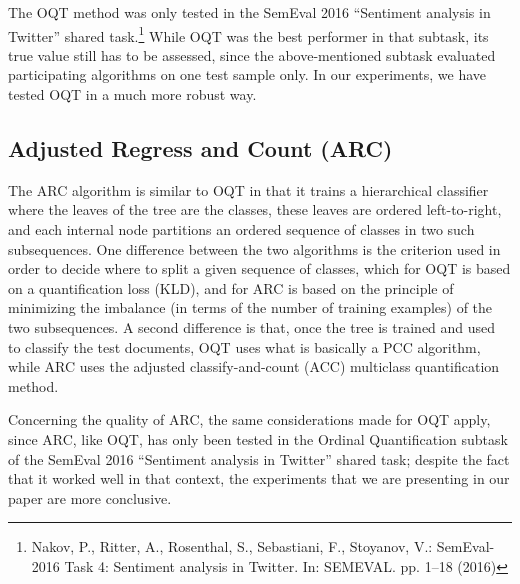 \documentclass[10pt,a4paper]{article}
\begin{document}
The OQT method was only tested in the SemEval 2016 ``Sentiment
analysis in Twitter'' shared task.\footnote{Nakov, P., Ritter, A.,
Rosenthal, S., Sebastiani, F., Stoyanov, V.: SemEval-2016 Task 4:
Sentiment analysis in Twitter. In: SEMEVAL. pp. 1–18 (2016)}
While OQT was the best performer in that subtask, its true value still
has to be assessed, since the above-mentioned subtask evaluated
participating algorithms on one test sample only.
In %
our experiments, we have tested OQT in a much more robust way.


\subsection{Adjusted Regress and Count (ARC)}
\label{sec:ARC}

\noindent The ARC algorithm 
is similar to OQT in that it trains a hierarchical classifier where
the leaves of the tree are the classes, these leaves are ordered
left-to-right, and each internal node partitions an ordered sequence
of classes in two such subsequences. One difference between the two
algorithms is the criterion used in order to decide where to split a
given sequence of classes, which for OQT is based on a quantification
loss (KLD), and for ARC is based on the principle of minimizing the
imbalance (in terms of the number of training examples) of the two
subsequences. A second difference is that, once the tree is trained
and used to classify the test documents, OQT uses what is basically a
PCC algorithm, while ARC uses the adjusted classify-and-count (ACC)
multiclass quantification method.%

Concerning the quality of ARC, the same considerations made for OQT
apply, since ARC, like OQT, has only been tested in the Ordinal
Quantification subtask of the SemEval 2016 ``Sentiment analysis in
Twitter'' shared task; despite the fact that it worked well in that
context, the experiments that we are presenting in
our paper are more conclusive.
\end{document}
